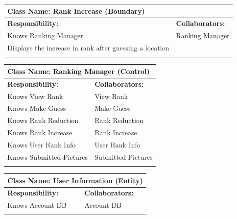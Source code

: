 \documentclass[]{article}
\begin{document}
\begin{itemize}
	\begin{table}
		\centering
		\begin{tabular}{|p{8cm}|p{8cm}|}
		\hline 
		 \multicolumn{2}{|l|}{\textbf{Class Name:} Rank Increase (Boundary)} \\
		\hline
		\textbf{Responsibility:} & \textbf{Collaborators:} \\
		\hline
		Knows Ranking Manager & Ranking Manager \\
		Displays the increase in rank after guessing a location & \\
		\vspace{1in} & \\
		\hline
		\end{tabular}
	\end{table}

	\begin{table}
		\centering
		\begin{tabular}{|p{8cm}|p{8cm}|}
		\hline 
		 \multicolumn{2}{|l|}{\textbf{Class Name:} Ranking Manager (Control)} \\
		\hline
		\textbf{Responsibility:} & \textbf{Collaborators:} \\
		\hline
		Knows View Rank & View Rank \\
		Knows Make Guess & Make Guess \\
		Knows Rank Reduction & Rank Reduction \\
		Knows Rank Increase & Rank Increase \\
		Knows User Rank Info & User Rank Info \\
		Knows Submitted Pictures & Submitted Pictures \\
		\vspace{1in} & \\
		\hline
		\end{tabular}
	\end{table}

	\begin{table}
		\centering
		\begin{tabular}{|p{8cm}|p{8cm}|}
		\hline 
		 \multicolumn{2}{|l|}{\textbf{Class Name:} User Information (Entity)} \\
		\hline
		\textbf{Responsibility:} & \textbf{Collaborators:} \\
		\hline
		Knows Account DB & Account DB \\
		\vspace{1in} & \\
		\hline
		\end{tabular}
	\end{table}


\end{itemize}
\end{document}
